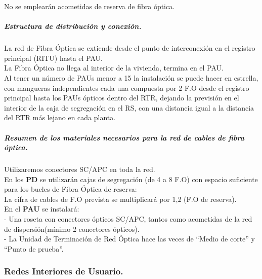 No se emplearán acometidas de reserva de fibra óptica.
\subparagraph{Estructura de distribución y conexión.}
La red de Fibra Óptica se extiende desde el punto de interconexión en el registro principal (RITU) hasta el PAU.\\
La Fibra Óptica no llega al interior de la vivienda, termina en el PAU.\\
Al tener un número de PAUs menor a 15 la instalación se puede hacer en estrella, con  mangueras independientes  cada una compuesta por 2 F.O desde el registro principal hasta los PAUs ópticos dentro del RTR, dejando la previsión en el interior de la caja de segregación en el RS, con una distancia igual a la distancia del RTR más lejano en cada planta.\\
\subparagraph{Resumen de los materiales necesarios para la red de cables de fibra óptica.}
Utilizaremos conectores SC/APC en toda la red.\\
En los \textbf{PD} se utilizarán cajas de segregación (de 4 a 8 F.O) con espacio suficiente para los bucles de Fibra Óptica de reserva:\\ 
La cifra de cables de F.O prevista se multiplicará por 1,2 (F.O de reserva).\\
En el \textbf{PAU} se instalará:\\
	- Una roseta con conectores ópticos SC/APC, tantos como acometidas de la red de dispersión(mínimo 2 conectores ópticos).\\
	- La Unidad de Terminación de Red Óptica hace las veces de ``Medio de corte'' y ``Punto de prueba''.\\
\subsubsection{Redes Interiores de Usuario.}
